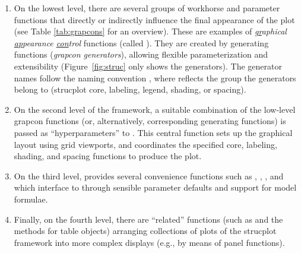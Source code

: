 \documentclass[11pt]{book}
\begin{document}

\begin{enumerate}

\item On the lowest level, there are several groups of workhorse and
parameter functions that directly or indirectly influence the final
appearance of the plot (see Table \ref{tab:grapcons} for an overview).
These are examples of 
\emph{\underline{gr}aphical \underline{ap}pearance \underline{con}trol} functions
(called ). 
They are created by generating functions
(\emph{grapcon generators}), allowing
flexible parameterization and extensibility (Figure~\ref{fig:struc}
only shows the generators). The generator names
follow the naming convention ,
where  reflects the group the
generators belong to (strucplot core, labeling,
legend, shading, or spacing). 

\item On the second level of the framework, a suitable combination
of the low-level grapcon functions (or, alternatively, corresponding generating functions)
is passed as ``hyperparameters'' to .
This central function
sets up the graphical layout using grid viewports,
and coordinates the specified core, labeling, shading, and spacing functions to produce
the plot. 

\item On the third level,  provides
several convenience functions such as ,
, , and  which
interface to  through sensible parameter defaults
and support for model formulae. 

\item Finally, on the fourth
level, there are ``related''  functions (such as 
and the  methods for table objects)
arranging collections of plots of the strucplot
framework into more complex displays (e.g., by means of panel functions).
\end{enumerate}
\end{document}
